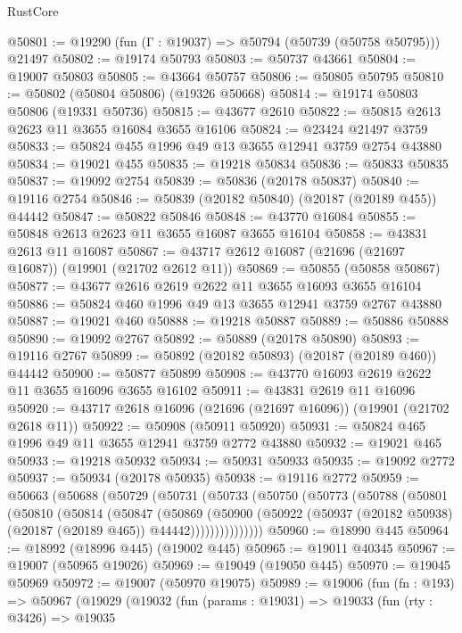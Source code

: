\begin{lexlean}{RustCore}
\begin{coremodule}
@50801 := @19290 (fun (Γ : @19037) => @50794 (@50739 (@50758 @50795))) @21497
@50802 := @19174 @50793
@50803 := @50737 @43661
@50804 := @19007 @50803
@50805 := @43664 @50757
@50806 := @50805 @50795
@50810 := @50802 (@50804 @50806) (@19326 @50668)
@50814 := @19174 @50803 @50806 (@19331 @50736)
@50815 := @43677 @2610
@50822 := @50815 @2613 @2623 @11 @3655 @16084 @3655 @16106
@50824 := @23424 @21497 @3759
@50833 := @50824 @455 @1996 @49 @13 @3655 @12941 @3759 @2754 @43880
@50834 := @19021 @455
@50835 := @19218 @50834
@50836 := @50833 @50835
@50837 := @19092 @2754
@50839 := @50836 (@20178 @50837)
@50840 := @19116 @2754
@50846 := @50839 (@20182 @50840) (@20187 (@20189 @455)) @44442
@50847 := @50822 @50846
@50848 := @43770 @16084
@50855 := @50848 @2613 @2623 @11 @3655 @16087 @3655 @16104
@50858 := @43831 @2613 @11 @16087
@50867 := @43717 @2612 @16087 (@21696 (@21697 @16087)) (@19901 (@21702 @2612 @11))
@50869 := @50855 (@50858 @50867)
@50877 := @43677 @2616 @2619 @2622 @11 @3655 @16093 @3655 @16104
@50886 := @50824 @460 @1996 @49 @13 @3655 @12941 @3759 @2767 @43880
@50887 := @19021 @460
@50888 := @19218 @50887
@50889 := @50886 @50888
@50890 := @19092 @2767
@50892 := @50889 (@20178 @50890)
@50893 := @19116 @2767
@50899 := @50892 (@20182 @50893) (@20187 (@20189 @460)) @44442
@50900 := @50877 @50899
@50908 := @43770 @16093 @2619 @2622 @11 @3655 @16096 @3655 @16102
@50911 := @43831 @2619 @11 @16096
@50920 := @43717 @2618 @16096 (@21696 (@21697 @16096)) (@19901 (@21702 @2618 @11))
@50922 := @50908 (@50911 @50920)
@50931 := @50824 @465 @1996 @49 @11 @3655 @12941 @3759 @2772 @43880
@50932 := @19021 @465
@50933 := @19218 @50932
@50934 := @50931 @50933
@50935 := @19092 @2772
@50937 := @50934 (@20178 @50935)
@50938 := @19116 @2772
@50959 := @50663
    (@50688
      (@50729
        (@50731
          (@50733
            (@50750
              (@50773
                (@50788
                  (@50801
                    (@50810
                      (@50814
                        (@50847
                          (@50869
                            (@50900
                              (@50922
                                (@50937 (@20182 @50938) (@20187 (@20189 @465)) @44442)))))))))))))))
@50960 := @18990 @445
@50964 := @18992 (@18996 @445) (@19002 @445)
@50965 := @19011 @40345
@50967 := @19007 (@50965 @19026)
@50969 := @19049 (@19050 @445)
@50970 := @19045 @50969
@50972 := @19007 (@50970 @19075)
@50989 := @19006
    (fun (fn : @193) =>
    @50967
      (@19029
        (@19032
          (fun (params : @19031) =>
          @19033
            (fun (rty : @3426) =>
            @19035

\end{coremodule}
\end{lexlean}
